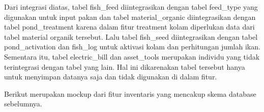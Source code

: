 \begin{enumerate}
\begin{enumerate}
		Dari integrasi diatas, tabel fish\_feed diintegrasikan dengan tabel feed\_type yang digunakan untuk input pakan dan tabel material\_organic diintegrasikan dengan tabel pond\_treatment karena dalam fitur treatment kolam diperlukan data dari tabel material organik tersebut. Lalu tabel fish\_seed diintegrasikan dengan tabel pond\_activation dan fish\_log untuk aktivasi kolam dan perhitungan jumlah ikan. Sementara itu, tabel electric\_bill dan asset\_tools merupakan individu yang tidak terintegrasi dengan tabel yang lain. Hal ini dikarenakan tabel tersebut hanya untuk menyimpan datanya saja dan tidak digunakan di dalam fitur.
		
		Berikut merupakan mockup dari fitur inventaris yang mencakup skema database sebelumnya.

		\begin{figure}[H]
			\hspace{.15\linewidth}

\end{figure}
\end{enumerate}
\end{enumerate}
